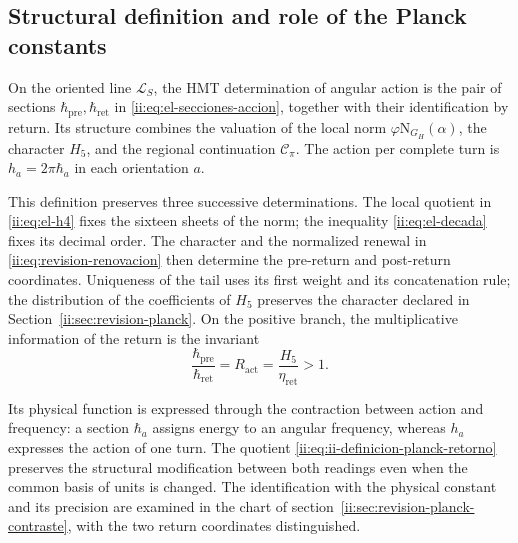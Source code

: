 \subsection{Structural definition and role of the Planck constants}
\label{ii:sec:ii-definicion-planck}

\begin{definition}
On the oriented line \(\mathcal L_S\), the HMT determination of
angular action is the pair of sections
\(\hbar_{\mathrm{pre}},\hbar_{\mathrm{ret}}\) in
\eqref{ii:eq:el-secciones-accion}, together with their identification by return.
Its structure combines the valuation of the local norm
\(\varphi\mathrm N_{G_H}(\alpha)\), the character \(H_5\), and the
regional continuation \(\mathcal C_\pi\). The action per complete turn
is \(h_a=2\pi\hbar_a\) in each orientation \(a\).
\end{definition}

This definition preserves three successive determinations. The local
quotient in \eqref{ii:eq:el-h4} fixes the sixteen sheets of the norm;
the inequality \eqref{ii:eq:el-decada} fixes its decimal order. The character and
the normalized renewal in \eqref{ii:eq:revision-renovacion} then determine
the pre-return and post-return coordinates. Uniqueness of the tail
uses its first weight and its concatenation rule; the distribution of
the coefficients of \(H_5\) preserves the character declared in
Section~\ref{ii:sec:revision-planck}. On the positive branch, the multiplicative
information of the return is the invariant
\begin{equation}
 \frac{\hbar_{\mathrm{pre}}}{\hbar_{\mathrm{ret}}}
 =R_{\mathrm{act}}=\frac{H_5}{\eta_{\mathrm{ret}}}>1.
 \label{ii:eq:ii-definicion-planck-retorno}
\end{equation}

Its physical function is expressed through the contraction between action and
frequency: a section \(\hbar_a\) assigns energy to an angular
frequency, whereas \(h_a\) expresses the action of one turn. The quotient
\eqref{ii:eq:ii-definicion-planck-retorno} preserves the structural
modification between both readings even when the common basis
of units is changed. The identification with the physical constant and its precision
are examined in the chart of section~\ref{ii:sec:revision-planck-contraste},
with the two return coordinates distinguished.

